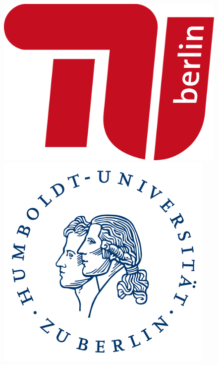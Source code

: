 \begin{titlepage}
\thispagestyle{empty}

\begin{figure}[!htb]

  \includegraphics[width=\linewidth]{Logos/tu.png}
\endminipage\hfill
\hspace*{0.5cm}
{}
  \includegraphics[width=\linewidth]{Logos/hu.png}

\end{figure}
\end{titlepage}
